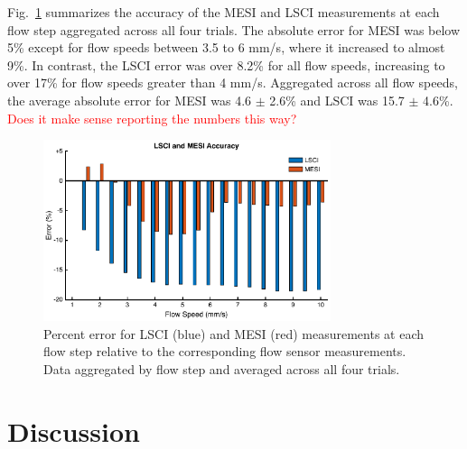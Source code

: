 \documentclass[12pt]{spieman}
\begin{document}
\begin{spacing}{2}
Fig.~\ref{fig:error} summarizes the accuracy of the MESI and LSCI measurements at each flow step aggregated across all four trials. The absolute error for MESI was below 5\% except for flow speeds between 3.5 to 6 mm/s, where it increased to almost 9\%. In contrast, the LSCI error was over 8.2\% for all flow speeds, increasing to over 17\% for flow speeds greater than 4 mm/s. Aggregated across all flow speeds, the average absolute error for MESI was 4.6 $\pm$ 2.6\% and LSCI was 15.7 $\pm$ 4.6\%. \textcolor{red}{Does it make sense reporting the numbers this way?}

\begin{figure}
    \centering
    \includegraphics[width=0.75\textwidth]{Figure7.pdf}
    \caption {
        Percent error for LSCI (blue) and MESI (red) measurements at each flow step relative to the corresponding flow sensor measurements. Data aggregated by flow step and averaged across all four trials.
    }
    \label{fig:error}
\end{figure}


\section{Discussion}
\label{sect:discussion}


\end{spacing}
\end{document}
